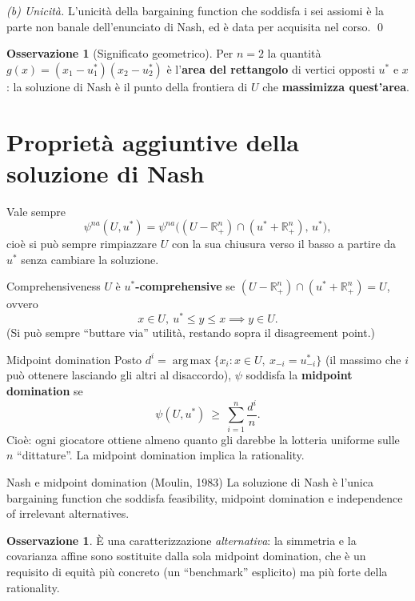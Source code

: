 \documentclass[12pt,a4paper,twoside]{book}
\theoremstyle{plain}
\theoremstyle{definition}
\newtheorem{remark}[theorem]{Osservazione}
\newcommand{\argmax}{\operatorname*{arg\,max}}
\begin{document}
\emph{(b) Unicità.} L'unicità della bargaining function che soddisfa i sei assiomi è
la parte non banale dell'enunciato di Nash, ed è data per acquisita nel corso. \qed

\begin{remark}[Significato geometrico]
Per $n=2$ la quantità $g(x)=(x_1-u^*_1)(x_2-u^*_2)$ è l'\textbf{area del rettangolo} di
vertici opposti $u^*$ e $x$: la soluzione di Nash è il punto della frontiera di $U$ che
\textbf{massimizza quest'area}.
\end{remark}

\section{Proprietà aggiuntive della soluzione di Nash}

Vale sempre
\[
  \psi^{na}(U,u^*)=\psi^{na}\bigl((U-\mathbb{R}^n_+)\cap(u^*+\mathbb{R}^n_+),\,u^*\bigr),
\]
cioè si può sempre rimpiazzare $U$ con la sua chiusura verso il basso a partire da $u^*$
senza cambiare la soluzione.

\begin{defbox}{Comprehensiveness}
$U$ è \textbf{$u^*$-comprehensive} se $(U-\mathbb{R}^n_+)\cap(u^*+\mathbb{R}^n_+)=U$, ovvero
\[
  x\in U,\ u^*\le y\le x\implies y\in U .
\]
(Si può sempre ``buttare via'' utilità, restando sopra il disagreement point.)
\end{defbox}

\begin{defbox}{Midpoint domination}
Posto $d^i=\argmax\{x_i : x\in U,\ x_{-i}=u^*_{-i}\}$ (il massimo che $i$ può ottenere
lasciando gli altri al disaccordo), $\psi$ soddisfa la \textbf{midpoint domination} se
\[
  \psi(U,u^*)\ \ge\ \sum_{i=1}^n \frac{d^i}{n}.
\]
Cioè: ogni giocatore ottiene almeno quanto gli darebbe la lotteria uniforme sulle
$n$ ``dittature''. La midpoint domination implica la rationality.
\end{defbox}

\begin{thmbox}{Nash e midpoint domination (Moulin, 1983)}
La soluzione di Nash è l'unica bargaining function che soddisfa feasibility,
midpoint domination e independence of irrelevant alternatives.
\end{thmbox}

\begin{remark}
È una caratterizzazione \emph{alternativa}: la simmetria e la covarianza affine sono
sostituite dalla sola midpoint domination, che è un requisito di equità più concreto
(un ``benchmark'' esplicito) ma più forte della rationality.
\end{remark}
\end{document}
